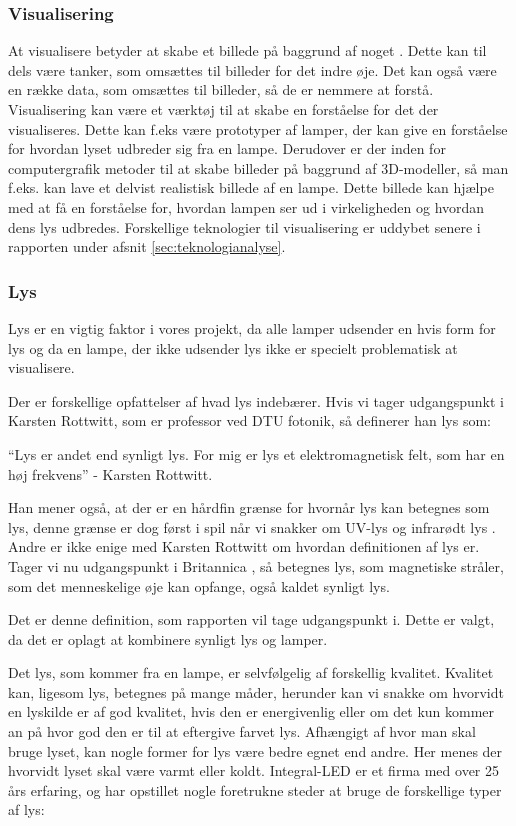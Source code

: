 \subsubsection{Visualisering}
At visualisere betyder at skabe et billede på baggrund af noget \cite{ddo_visualisering}. Dette kan til dels være tanker, som omsættes til billeder for det indre øje. Det kan også være en række data, som omsættes til billeder, så de er nemmere at forstå.
Visualisering kan være et værktøj til at skabe en forståelse for det der visualiseres. Dette kan f.eks være prototyper af lamper, der kan give en forståelse for hvordan lyset udbreder sig fra en lampe. Derudover er der inden for computergrafik metoder til at skabe billeder på baggrund af 3D-modeller, så man f.eks. kan lave et delvist realistisk billede af en lampe. Dette billede kan hjælpe med at få en forståelse for, hvordan lampen ser ud i virkeligheden og hvordan dens lys udbredes. Forskellige teknologier til visualisering er uddybet senere i rapporten under afsnit \ref{sec:teknologianalyse}. 

\subsubsection{Lys}
Lys er en vigtig faktor i vores projekt, da alle lamper udsender en hvis form for lys og da en lampe, der ikke udsender lys ikke er specielt problematisk at visualisere.


Der er forskellige opfattelser af hvad lys indebærer. Hvis vi tager udgangspunkt i Karsten Rottwitt, som er professor ved DTU fotonik, så definerer han lys som:


“Lys er andet end synligt lys. For mig er lys et elektromagnetisk felt, som har en høj frekvens”
- Karsten Rottwitt\cite{def_lys}.

Han mener også, at der er en hårdfin grænse for hvornår lys kan betegnes som lys, denne grænse er dog først i spil når vi snakker om UV-lys og infrarødt lys \cite{def_lys}. 
Andre er ikke enige med Karsten Rottwitt om hvordan definitionen af lys er. Tager vi nu udgangspunkt i Britannica \cite{britannica_lys}, så betegnes lys, som magnetiske stråler, som det menneskelige øje kan opfange, også kaldet synligt lys. 


Det er denne definition, som rapporten vil tage udgangspunkt i. Dette er valgt, da det er oplagt at kombinere synligt lys og lamper.

Det lys, som kommer fra en lampe, er selvfølgelig af forskellig kvalitet. Kvalitet kan, ligesom lys, betegnes på mange måder, herunder kan vi snakke om hvorvidt en lyskilde er af god kvalitet, hvis den er energivenlig eller om det kun kommer an på hvor god den er til at eftergive farvet lys. 
Afhængigt af hvor man skal bruge lyset, kan nogle former for lys være bedre egnet end andre. Her menes der hvorvidt lyset skal være varmt eller koldt. Integral-LED er et firma med over 25 års erfaring\cite{integral_led}, og har opstillet nogle foretrukne steder at bruge de forskellige typer af lys:

